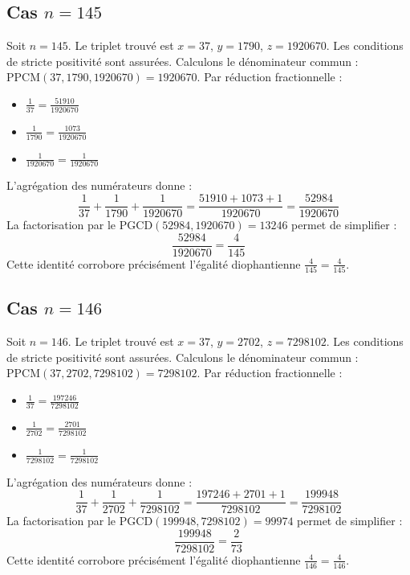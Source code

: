 \documentclass[11pt,a4paper]{article}
\begin{document}
\subsection{Cas $n = 145$}
Soit $n = 145$. Le triplet trouvé est $x = 37$, $y = 1790$, $z = 1920670$.
Les conditions de stricte positivité sont assurées.
Calculons le dénominateur commun : $\text{PPCM}(37, 1790, 1920670) = 1920670$.
Par réduction fractionnelle :
\begin{itemize}
    \item $\frac{1}{37} = \frac{51910}{1920670}$
    \item $\frac{1}{1790} = \frac{1073}{1920670}$
    \item $\frac{1}{1920670} = \frac{1}{1920670}$
\end{itemize}
L'agrégation des numérateurs donne :
$$ \frac{1}{37} + \frac{1}{1790} + \frac{1}{1920670} = \frac{51910 + 1073 + 1}{1920670} = \frac{52984}{1920670} $$
La factorisation par le $\text{PGCD}(52984, 1920670) = 13246$ permet de simplifier :
$$ \frac{52984}{1920670} = \frac{4}{145} $$
Cette identité corrobore précisément l'égalité diophantienne $\frac{4}{145} = \frac{4}{145}$.

\subsection{Cas $n = 146$}
Soit $n = 146$. Le triplet trouvé est $x = 37$, $y = 2702$, $z = 7298102$.
Les conditions de stricte positivité sont assurées.
Calculons le dénominateur commun : $\text{PPCM}(37, 2702, 7298102) = 7298102$.
Par réduction fractionnelle :
\begin{itemize}
    \item $\frac{1}{37} = \frac{197246}{7298102}$
    \item $\frac{1}{2702} = \frac{2701}{7298102}$
    \item $\frac{1}{7298102} = \frac{1}{7298102}$
\end{itemize}
L'agrégation des numérateurs donne :
$$ \frac{1}{37} + \frac{1}{2702} + \frac{1}{7298102} = \frac{197246 + 2701 + 1}{7298102} = \frac{199948}{7298102} $$
La factorisation par le $\text{PGCD}(199948, 7298102) = 99974$ permet de simplifier :
$$ \frac{199948}{7298102} = \frac{2}{73} $$
Cette identité corrobore précisément l'égalité diophantienne $\frac{4}{146} = \frac{4}{146}$.
\end{document}
